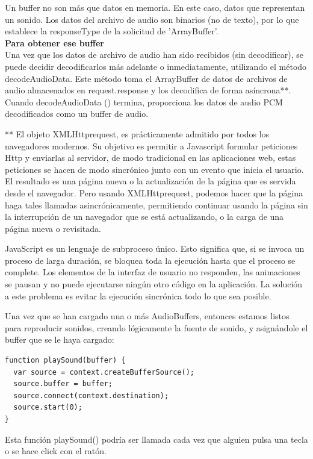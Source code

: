 Un buffer no son más que datos en memoria. En este caso, datos que representan un sonido.
Los datos del archivo de audio son binarios (no de texto), por lo que establece la responseType de la solicitud de 'ArrayBuffer'.\\

\noindent\textbf{Para obtener ese buffer}\\
Una vez que los datos de archivo de audio han sido recibidos (sin decodificar), se puede decidir decodificarlos más adelante o inmediatamente, utilizando el método decodeAudioData. Este método toma el ArrayBuffer de datos de archivos de audio almacenados en request.response y los decodifica de forma asíncrona**. 
Cuando decodeAudioData () termina, proporciona los datos de audio PCM decodificados  como un buffer de audio.

** 
El objeto XMLHttprequest, es prácticamente admitido por todos los navegadores modernos. Su objetivo es permitir a Javascript formular peticiones Http y enviarlas al servidor, de modo tradicional en las aplicaciones web, estas peticiones se hacen de modo sincrónico junto con un evento que inicia el usuario. El resultado es una página nueva o la actualización de la página que es servida desde el navegador. Pero usando XMLHttprequest, podemos hacer que la página haga tales llamadas asincrónicamente, permitiendo continuar usando la página sin la interrupción de un navegador que se está actualizando, o la carga de una página nueva o revisitada.

JavaScript es un lenguaje de subproceso único. Esto significa que, si se invoca un proceso de larga duración, se bloquea toda la ejecución hasta que el proceso se complete. Los elementos de la interfaz de usuario no responden, las animaciones se pausan y no puede ejecutarse ningún otro código en la aplicación. La solución a este problema es evitar la ejecución sincrónica todo lo que sea posible.

Una vez que se han cargado una o más AudioBuffers, entonces estamos listos para reproducir sonidos,  creando lógicamente la fuente de sonido, y asignándole el buffer que se le haya cargado:
\begin{verbatim}
function playSound(buffer) {
  var source = context.createBufferSource(); 
  source.buffer = buffer;                    
  source.connect(context.destination);       
  source.start(0);                           
}
\end{verbatim}

Esta función playSound() podría ser llamada cada vez que alguien pulsa una tecla o se hace click con el ratón. 

